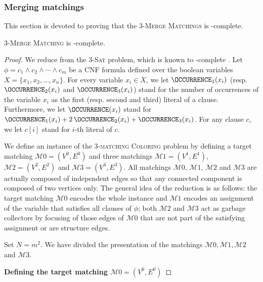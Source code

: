 \subsubsection{Merging matchings}
\label{section:Merging matchings}

This section is devoted to proving that the
\textsc{$3$-Merge Matchings} is \NP-complete.

\begin{proposition}
  \label{proposition:3-merge matching is NP-complete}
  \textsc{$3$-Merge Matching} is \NP-complete.
\end{proposition}

\begin{proof}
  We reduce from the \textsc{$3$-Sat} problem, which is known to
  \NP-complete \cite{DBLP:conf/coco/Karp72}.
  Let $\phi = c_1 \wedge c_2 \wedge \cdots \wedge c_m$ be a CNF formula
  defined over the boolean variables $X =\{x_1, x_2, \dots, x_n\}$.
  For every variable $x_{i} \in X$,
  we let $\OCCURRENCE_1(x_{i})$ (resp. $\OCCURRENCE_2(x_{i})$ and $\OCCURRENCE_3(x_{i})$)
  stand for the number of occurrences of the variable $x_{i}$ as the first (resp. second and third)
  literal of a clause.
  Furthermore, we let $\OCCURRENCE(x_{i})$ stand for
  $\OCCURRENCE_1(x_{i}) + 2\,\OCCURRENCE_2(x_{i}) + \OCCURRENCE_3(x_{i})$.
  For any clause $c$, we let $c[i]$ stand for
  $i$-th literal of $c$.

  We define an instance of the \textsc{$3$-matching Coloring} problem by defining a
  target matching $\mathcal{M}{0} = (V^{0}, E^{0})$
  and three matchings
  $\mathcal{M}{1} = (V^{1}, E^{1})$, $\mathcal{M}{2} = (V^{2}, E^{2})$ and $\mathcal{M}{3} = (V^{3}, E^{3})$.
  All matchings $\mathcal{M}{0}$, $\mathcal{M}{1}$, $\mathcal{M}{2}$ and $\mathcal{M}{3}$ are actually composed
  of independent edges so that any connected component is composed of two vertices only.
  The general idea of the reduction is as follows:
  the target matching $\mathcal{M}{0}$ encodes the whole instance
  and $\mathcal{M}{1}$ encodes an assignment of the variable that satisfies all clauses of $\phi$;
  both $\mathcal{M}{2}$ and $\mathcal{M}{3}$ act as garbage collectors by focusing of those edges of $\mathcal{M}{0}$
  that are not part of the satisfying assignment or are structure edges.

  Set $N=m^2$.
  We have divided the presentation of the matchings $\mathcal{M}{0}, \mathcal{M}{1}, \mathcal{M}{2}$ and $\mathcal{M}{3}$.

  \medskip
  \textbf{Defining the target matching $\mathcal{M}{0} = (V^{0}, E^{0})$}
  \medskip


\end{proof}
